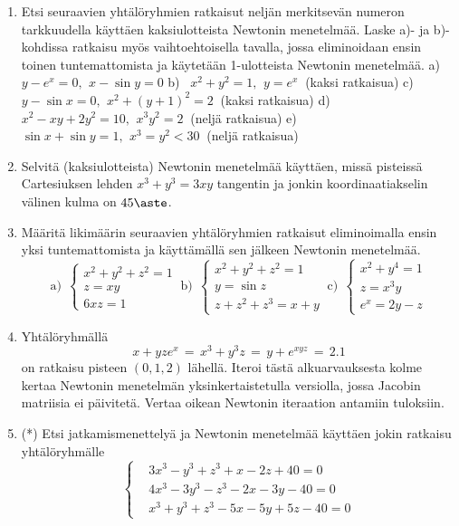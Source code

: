 \begin{enumerate}
\item
Etsi seuraavien yhtälöryhmien ratkaisut neljän merkitsevän numeron tarkkuudella käyttäen
kaksiulotteista Newtonin menetelmää. Laske a)- ja b)-kohdissa ratkaisu myös vaihtoehtoisella
tavalla, jossa eliminoidaan ensin toinen tuntemattomista ja käytetään 1-ulotteista Newtonin
menetelmää. \vspace{1mm}\newline
a) \ $y-e^x=0,\,\ x-\sin y=0$ \newline
b) \ $x^2+y^2=1,\,\ y=e^x\ $ (kaksi ratkaisua) \newline 
c) \ $y-\sin x=0,\,\ x^2+(y+1)^2=2\ $ (kaksi ratkaisua) \newline
d) \ $x^2-xy+2y^2=10,\,\ x^3y^2=2\ $ (neljä ratkaisua) \newline
e) \ $\sin x+\sin y=1,\,\ x^3=y^2<30\ $ (neljä ratkaisua)

\item 
Selvitä (kaksiulotteista) Newtonin menetelmää käyttäen, missä pisteissä Cartesiuksen lehden
$x^3 + y^3 = 3xy$ tangentin ja jonkin koordinaatiakselin välinen kulma on $45\aste$.

\item
Määritä likimäärin seuraavien yhtälöryhmien ratkaisut eliminoimalla ensin yksi tuntemattomista
ja käyttämällä sen jälkeen Newtonin menetelmää.
\[
\text{a)}\ \ \begin{cases} x^2+y^2+z^2=1\\z=xy\\6xz=1 \end{cases} \
\text{b)}\ \ \begin{cases} x^2+y^2+z^2=1\\y=\sin z\\z+z^2+z^3=x+y \end{cases} \
\text{c)}\ \ \begin{cases} x^2+y^4=1\\z=x^3y\\e^x=2y-z \end{cases}
\]

\item
Yhtälöryhmällä
\[
x+yze^x \,=\, x^3+y^3z \,=\, y+e^{xyz} \,=\, 2.1
\]
on ratkaisu pisteen $(0,1,2)$ lähellä. Iteroi tästä alkuarvauksesta kolme kertaa Newtonin
menetelmän yksinkertaistetulla versiolla, jossa Jacobin matriisia ei päivitetä. Vertaa oikean 
Newtonin iteraation antamiin tuloksiin.

\item (*)
Etsi jatkamismenettelyä ja Newtonin menetelmää käyttäen jokin ratkaisu yhtälöryhmälle
\[
\left\{ \begin{aligned}
        &3x^3-y^3+z^3+x-2z+40=0 \\ 
        &4x^3-3y^3-z^3-2x-3y-40=0 \\ 
        &x^3+y^3+z^3-5x-5y+5z-40=0
        \end{aligned} \right.
\] 


\end{enumerate}
